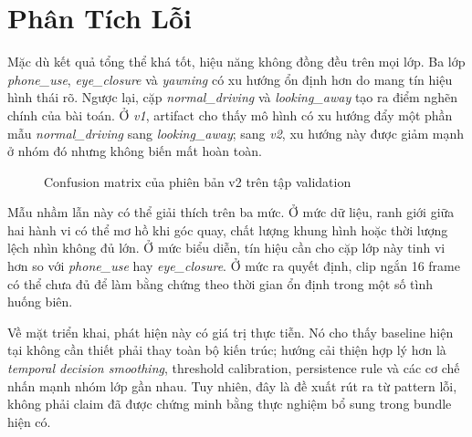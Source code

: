 \documentclass[conference,a4paper]{IEEEtran}
\begin{document}
\section[Phan Tich Loi]{Phân Tích Lỗi}
Mặc dù kết quả tổng thể khá tốt, hiệu năng không đồng đều trên mọi lớp. Ba lớp \textit{phone\_use}, \textit{eye\_closure} và \textit{yawning} có xu hướng ổn định hơn do mang tín hiệu hình thái rõ. Ngược lại, cặp \textit{normal\_driving} và \textit{looking\_away} tạo ra điểm nghẽn chính của bài toán. Ở \textit{v1}, artifact cho thấy mô hình có xu hướng đẩy một phần mẫu \textit{normal\_driving} sang \textit{looking\_away}; sang \textit{v2}, xu hướng này được giảm mạnh ở nhóm đó nhưng không biến mất hoàn toàn.

\begin{figure}[t]
\caption{Confusion matrix của phiên bản v2 trên tập validation}
\label{fig:confusion-matrix}
\centering
{}
\end{figure}

Mẫu nhầm lẫn này có thể giải thích trên ba mức. Ở mức dữ liệu, ranh giới giữa hai hành vi có thể mơ hồ khi góc quay, chất lượng khung hình hoặc thời lượng lệch nhìn không đủ lớn. Ở mức biểu diễn, tín hiệu cần cho cặp lớp này tinh vi hơn so với \textit{phone\_use} hay \textit{eye\_closure}. Ở mức ra quyết định, clip ngắn 16 frame có thể chưa đủ để làm bằng chứng theo thời gian ổn định trong một số tình huống biên.

Về mặt triển khai, phát hiện này có giá trị thực tiễn. Nó cho thấy baseline hiện tại không cần thiết phải thay toàn bộ kiến trúc; hướng cải thiện hợp lý hơn là \textit{temporal decision smoothing}, threshold calibration, persistence rule và các cơ chế nhấn mạnh nhóm lớp gần nhau. Tuy nhiên, đây là đề xuất rút ra từ pattern lỗi, không phải claim đã được chứng minh bằng thực nghiệm bổ sung trong bundle hiện có.
\end{document}
